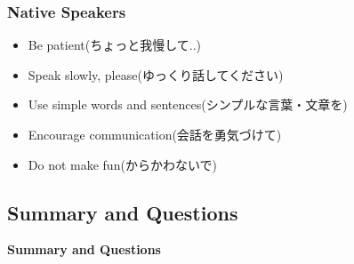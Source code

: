 \documentclass[aspectratio=169,11pt,hyperref={colorlinks=true}]{beamer}
\begin{document}
\begin{frame}
\frametitle{Native Speakers}
  \begin{itemize}
  \item Be patient(ちょっと我慢して..)
  \item Speak slowly, please(ゆっくり話してください)
  \item Use simple words and sentences(シンプルな言葉・文章を)
  \item Encourage communication(会話を勇気づけて)
  \item Do not make fun(からかわないで)
  \end{itemize}
\end{frame}

\subsection{Summary and Questions}
\begin{frame}
  \bf\Huge{Summary and Questions}
\end{frame}
\end{document}
